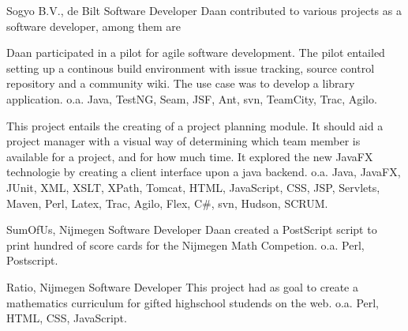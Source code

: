 	\begin{workExperience}{Sogyo B.V., de Bilt}%
	{Software Developer}{}
                Daan contributed to various projects as a software
                developer, among them are
		
                Daan participated in a pilot for agile software
                development. The pilot entailed setting up a continous
                build environment with issue tracking, source control
                repository and a community wiki. The use case was to develop a
                library application.
		\technics o.a. Java, TestNG, Seam, JSF, Ant, svn, TeamCity, Trac, Agilo.
		
                This project entails the creating of a project
                planning module. It should aid a project manager with
                a visual way of determining which team member is
                available for a project, and for how much time.
                It explored the new JavaFX technologie by creating a
                client interface upon a java backend.
		\technics o.a. Java, JavaFX, JUnit, XML, XSLT, XPath, Tomcat, HTML,
		JavaScript, CSS, JSP, Servlets, Maven, Perl, Latex, Trac, Agilo, Flex,
		C\#, svn, Hudson, SCRUM.

	\end{workExperience}
	
	\begin{workExperience}{SumOfUs, Nijmegen}%
	{Software Developer}%
	{}
                Daan created a PostScript script to print hundred of
                score cards for the Nijmegen Math Competion.
		\technics o.a. Perl, Postscript.
	\end{workExperience}

	\begin{workExperience}{Ratio, Nijmegen}%
	{Software Developer}%
	{}
                This project had as goal to create a mathematics
                curriculum for gifted highschool studends on the web.
		\technics o.a. Perl, HTML, CSS, JavaScript.	
	\end{workExperience}
